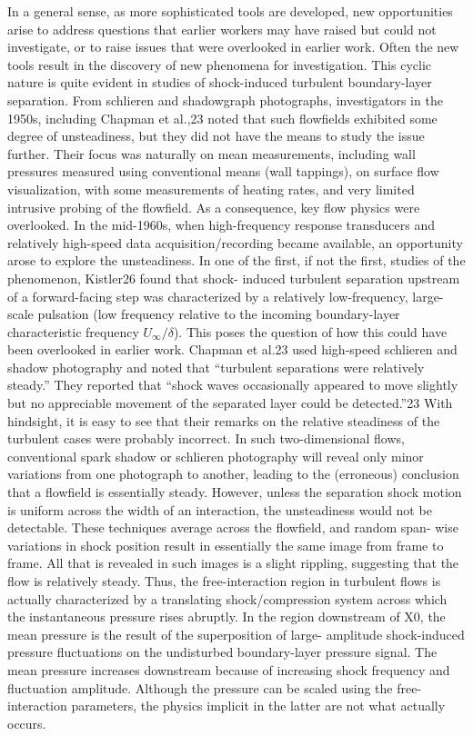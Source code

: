 In a general sense, as more sophisticated tools are developed, new opportunities arise to address questions that earlier workers may have raised but could not investigate, or to raise issues that were overlooked in earlier work. Often the new tools result in the discovery of new phenomena for investigation. This cyclic nature is quite evident in studies of shock-induced turbulent boundary-layer separation. From schlieren and shadowgraph photographs, investigators in the 1950s, including Chapman et al.,23 noted that such flowfields exhibited some degree of unsteadiness, but they did not have the means to study the issue further. Their focus was naturally on mean measurements, including wall pressures measured using conventional means (wall tappings), on surface flow visualization, with some measurements of heating rates, and very limited intrusive probing of the flowfield. As a consequence, key flow physics were overlooked. In the mid-1960s, when high-frequency response transducers and relatively high-speed data acquisition/recording became available, an opportunity arose to explore the unsteadiness. In one of the first, if not the first, studies of the phenomenon, Kistler26 found that shock- induced turbulent separation upstream of a forward-facing step was characterized by a relatively low-frequency, large-scale pulsation (low frequency relative to the incoming boundary-layer characteristic frequency $U_\infty/\delta$). This poses the question of how this could have been overlooked in earlier work. Chapman et al.23 used high-speed schlieren and shadow photography and noted that “turbulent separations were relatively steady.” They reported that “shock waves occasionally appeared to move slightly but no appreciable movement of the separated layer could be detected.”23 With hindsight, it is easy to see that their remarks on the relative steadiness of the turbulent cases were probably incorrect. In such two-dimensional flows, conventional spark shadow or schlieren photography will reveal only minor variations from one photograph to another, leading to the (erroneous) conclusion that a flowfield is essentially steady. However, unless the separation shock motion is uniform across the width of an interaction, the unsteadiness would not be detectable. These techniques average across the flowfield, and random span- wise variations in shock position result in essentially the same image from frame to frame. All that is revealed in such images is a slight rippling, suggesting that the flow is relatively steady. Thus, the free-interaction region in turbulent flows is actually characterized by a translating shock/compression system across which the instantaneous pressure rises abruptly. In the region downstream of X0, the mean pressure is the result of the superposition of large- amplitude shock-induced pressure fluctuations on the undisturbed boundary-layer pressure signal. The mean pressure increases downstream because of increasing shock frequency and fluctuation amplitude. Although the pressure can be scaled using the free-interaction parameters, the physics implicit in the latter are not what actually occurs.


